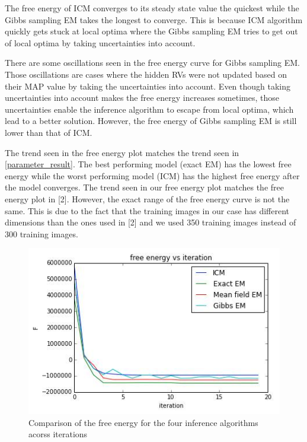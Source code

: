 \documentclass{article} %
\begin{document}
The free energy of ICM converges to its steady state value the quickest while the Gibbs sampling EM takes the longest to converge. This is because ICM algorithm quickly gets stuck at local optima where the Gibbs sampling EM tries to get out of local optima by taking uncertainties into account.

There are some oscillations seen in the free energy curve for Gibbs sampling EM. Those oscillations are cases where the hidden RVs were not updated based on their MAP value by taking the uncertainties into account. Even though taking uncertainties into account makes the free energy increases sometimes, those uncertainties enable the inference algorithm to escape from local optima, which lead to a better solution. However, the free energy of Gibbs sampling EM is still lower than that of ICM. 

The trend seen in the free energy plot matches the trend seen in \ref{parameter_result}. The best performing model (exact EM) has the lowest free energy while the worst performing model (ICM) has the highest free energy after the model converges. The trend seen in our free energy plot matches the free energy plot in [2]. However, the exact range of the free energy curve is not the same. This is due to the fact that the training images in our case has different dimensions than the ones used in [2] and we used 350 training images instead of 300 training images. 
\begin{figure}[h]
\begin{center}
\includegraphics[width=1\textwidth]{free_energy}
\end{center}
\caption{Comparison of the free energy for the four inference algorithms acorss iterations}
\label{fig:free_energy}
\end{figure}
\end{document}
